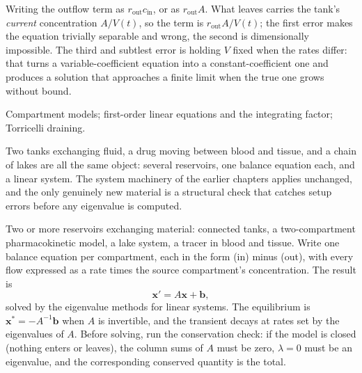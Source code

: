\begin{trap}
Writing the outflow term as $r_{\text{out}}c_{\text{in}}$, or as $r_{\text{out}}A$. What leaves carries the tank's \emph{current} concentration $A/V(t)$, so the term is $r_{\text{out}}A/V(t)$; the first error makes the equation trivially separable and wrong, the second is dimensionally impossible. The third and subtlest error is holding $V$ fixed when the rates differ: that turns a variable-coefficient equation into a constant-coefficient one and produces a solution that approaches a finite limit when the true one grows without bound.
\end{trap}

\begin{seealsob}Compartment models; first-order linear equations and the integrating factor; Torricelli draining.\end{seealsob}

Two tanks exchanging fluid, a drug moving between blood and tissue, and a chain of lakes are all the same object: several reservoirs, one balance equation each, and a linear system. The system machinery of the earlier chapters applies unchanged, and the only genuinely new material is a structural check that catches setup errors before any eigenvalue is computed.

\cue Two or more reservoirs exchanging material: connected tanks, a two-compartment pharmacokinetic model, a lake system, a tracer in blood and tissue.
\method Write one balance equation per compartment, each in the form (in) minus (out), with every flow expressed as a rate times the source compartment's concentration. The result is
\[\mathbf{x}'=A\mathbf{x}+\mathbf{b},\]
solved by the eigenvalue methods for linear systems. The equilibrium is $\mathbf{x}^{*}=-A^{-1}\mathbf{b}$ when $A$ is invertible, and the transient decays at rates set by the eigenvalues of $A$. Before solving, run the conservation check: if the model is closed (nothing enters or leaves), the column sums of $A$ must be zero, $\lambda=0$ must be an eigenvalue, and the corresponding conserved quantity is the total.

